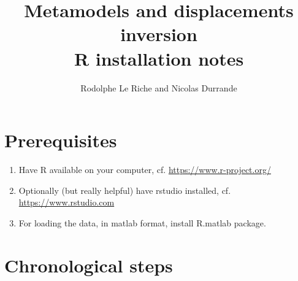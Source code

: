 \documentclass[12pt]{article}
\begin{document}
\title{Metamodels and displacements  inversion \\ R installation notes}
\author{Rodolphe Le Riche and Nicolas Durrande}
\maketitle

\section{Prerequisites}
\begin{enumerate}
\item Have R available on your computer, cf. \url{https://www.r-project.org/}
\item Optionally (but really helpful) have rstudio installed, cf. \url{https://www.rstudio.com}
\item For loading the data, in matlab format, install R.matlab package.
\end{enumerate}

\section{Chronological steps}
\end{document}
